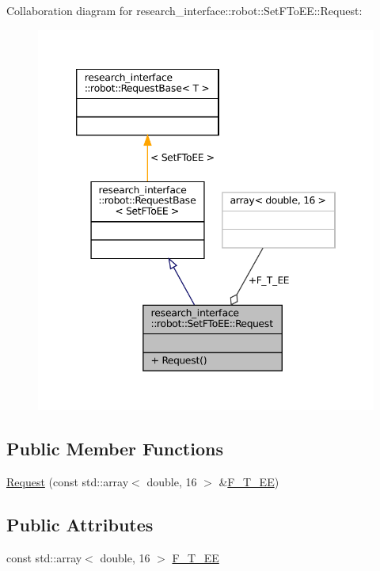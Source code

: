 Collaboration diagram for research\+\_\+interface\+:\+:robot\+:\+:Set\+F\+To\+EE\+:\+:Request\+:
\nopagebreak
\begin{figure}[H]
\begin{center}
\leavevmode
\includegraphics[width=346pt]{structresearch__interface_1_1robot_1_1SetFToEE_1_1Request__coll__graph}
\end{center}
\end{figure}
\subsection*{Public Member Functions}
\begin{DoxyCompactItemize}
\item 
\hyperlink{structresearch__interface_1_1robot_1_1SetFToEE_1_1Request_adf69aae090d61c42789cf8f46d9f5126}{Request} (const std\+::array$<$ double, 16 $>$ \&\hyperlink{structresearch__interface_1_1robot_1_1SetFToEE_1_1Request_ae4e7cdc5dcca7af0ab5545e321782af4}{F\+\_\+\+T\+\_\+\+EE})
\end{DoxyCompactItemize}
\subsection*{Public Attributes}
\begin{DoxyCompactItemize}
\item 
const std\+::array$<$ double, 16 $>$ \hyperlink{structresearch__interface_1_1robot_1_1SetFToEE_1_1Request_ae4e7cdc5dcca7af0ab5545e321782af4}{F\+\_\+\+T\+\_\+\+EE}
\end{DoxyCompactItemize}


